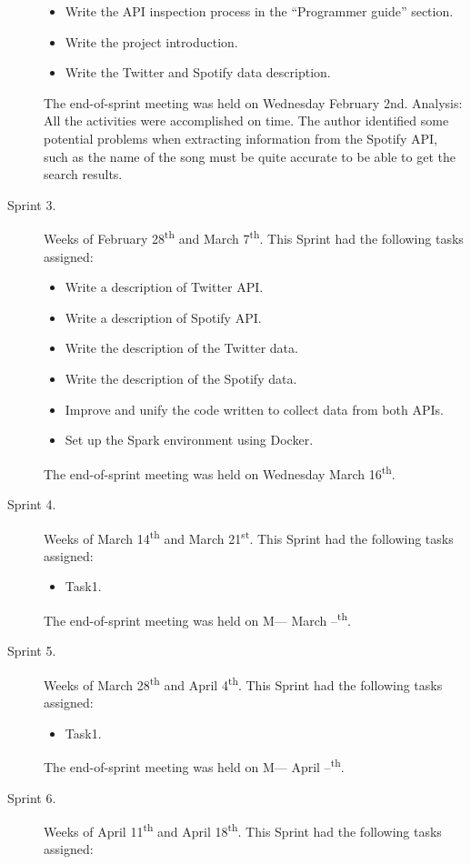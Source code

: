 \begin{description}
\begin{itemize}
		\item Write the API inspection process in the ``Programmer guide'' section.
		\item Write the project introduction.
		\item Write the Twitter and Spotify data description.
	\end{itemize}
	The end-of-sprint meeting was held on Wednesday February 2nd.
	Analysis: All the activities were accomplished on time. The author identified some potential problems when extracting information from the Spotify API, such as the name of the song must be quite accurate to be able to get the search results.
	\item[Sprint 3.] Weeks of February 28\textsuperscript{th} and March 7\textsuperscript{th}. This Sprint had the following tasks assigned:
	\begin{itemize}		
		\item Write a description of Twitter API.
		\item Write a description of Spotify API.
		\item Write the description of the Twitter data.
		\item Write the description of the Spotify data.
		\item Improve and unify the code written to collect data from both APIs.
		\item Set up the Spark environment using Docker.
	\end{itemize}
	The end-of-sprint meeting was held on Wednesday March 16\textsuperscript{th}.
	\item[Sprint 4.] Weeks of March 14\textsuperscript{th} and March 21\textsuperscript{st}. This Sprint had the following tasks assigned:
	\begin{itemize}
		\item Task1.
	\end{itemize}
	The end-of-sprint meeting was held on M--- March --\textsuperscript{th}.
	\item[Sprint 5.] Weeks of March 28\textsuperscript{th} and April 4\textsuperscript{th}. This Sprint had the following tasks assigned:
	\begin{itemize}
		\item Task1.
	\end{itemize}
	The end-of-sprint meeting was held on M--- April --\textsuperscript{th}.
	\item[Sprint 6.] Weeks of April 11\textsuperscript{th} and April 18\textsuperscript{th}. This Sprint had the following tasks assigned:
	\begin{itemize}

\end{itemize}
\end{description}
